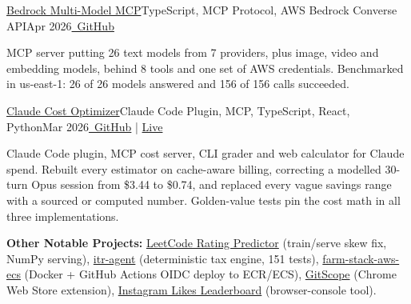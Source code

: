\resumeExp
{\href{https://github.com/Sagargupta16/bedrock-multi-model-mcp}{Bedrock Multi-Model MCP}}{TypeScript, MCP Protocol, AWS Bedrock Converse API}{Apr 2026}{\href{https://github.com/Sagargupta16/bedrock-multi-model-mcp}{\faGithub\ GitHub}}
\resumeItemListStart
    \item[$\diamond$] MCP server putting 26 text models from 7 providers, plus image, video and embedding models, behind 8 tools and one set of AWS credentials. Benchmarked in us-east-1: 26 of 26 models answered and 156 of 156 calls succeeded.
\resumeItemListEnd

\resumeExp
{\href{https://sagargupta.online/claude-cost-optimizer/}{Claude Cost Optimizer}}{Claude Code Plugin, MCP, TypeScript, React, Python}{Mar 2026}{\href{https://github.com/Sagargupta16/claude-cost-optimizer}{\faGithub\ GitHub} | \href{https://sagargupta.online/claude-cost-optimizer/}{Live}}
\resumeItemListStart
    \item[$\diamond$] Claude Code plugin, MCP cost server, CLI grader and web calculator for Claude spend. Rebuilt every estimator on cache-aware billing, correcting a modelled 30-turn Opus session from \$3.44 to \$0.74, and replaced every vague savings range with a sourced or computed number. Golden-value tests pin the cost math in all three implementations.
\resumeItemListEnd

\resumeSubHeadingListEnd
\vspace{-2pt}
\small{\textbf{Other Notable Projects:} \href{https://github.com/Sagargupta16/LeetCode_Rating_Predictor}{LeetCode Rating Predictor} (train/serve skew fix, NumPy serving), \href{https://github.com/Sagargupta16/itr-agent}{itr-agent} (deterministic tax engine, 151 tests), \href{https://github.com/Sagargupta16/farm-stack-aws-ecs}{farm-stack-aws-ecs} (Docker + GitHub Actions OIDC deploy to ECR/ECS), \href{https://chromewebstore.google.com/detail/gitscope/fndaanihifimmlnmkjdmjbbkbdajolff}{GitScope} (Chrome Web Store extension), \href{https://github.com/Sagargupta16/InstagramLikesLeaderboard}{Instagram Likes Leaderboard} (browser-console tool).}
\vspace{-2mm}
